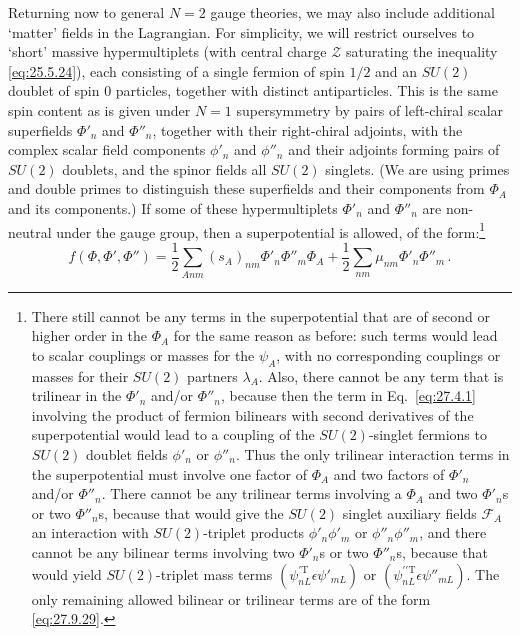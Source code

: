 Returning now to general \(N=2\) gauge theories, we may also include
additional `matter' fields in the Lagrangian. For simplicity, we will restrict
ourselves to `short' massive hypermultiplets (with central charge
\(\mathcal{Z}\) saturating the inequality \eqref{eq:25.5.24}), each consisting
of a single fermion of spin \(1/2\) and an \(SU(2)\) doublet of spin 0
particles, together with distinct antiparticles. This is the same spin
content as is given under \(N=1\) supersymmetry by pairs of left-chiral
scalar superfields \(\Phi'_n\) and \(\Phi''_n\), together with their
right-chiral adjoints, with the complex scalar field components \(\phi'_n\)
and \(\phi''_n\) and their adjoints forming pairs of \(SU(2)\) doublets, and
the spinor fields all \(SU(2)\) singlets. (We are using primes and double
primes to distinguish these superfields and their components from \(\Phi_A\)
and its components.) If some of these hypermultiplets \(\Phi'_n\) and
\(\Phi''_n\) are non-neutral under the gauge group, then a superpotential is
allowed, of the form:\footnote{There still cannot be any terms in the
superpotential that are of second or higher order in the \(\Phi_A\) for the
same reason as before: such terms would lead to scalar couplings or masses
for the \(\psi_A\), with no corresponding couplings or masses for their
\(SU(2)\) partners \(\lambda_A\). Also, there cannot be any term that is
trilinear in the \(\Phi'_n\) and/or \(\Phi''_n\), because then the term in
Eq.~\eqref{eq:27.4.1} involving the product of fermion bilinears with second
derivatives of the superpotential would lead to a coupling of the
\(SU(2)\)-singlet fermions to \(SU(2)\) doublet fields \(\phi'_n\) or
\(\phi''_n\). Thus the only trilinear interaction terms in the
superpotential must involve one factor of \(\Phi_A\) and two factors of
\(\Phi'_n\) and/or \(\Phi''_n\). There cannot be any trilinear terms
involving a \(\Phi_A\) and two \(\Phi'_n\)s or two \(\Phi''_n\)s, because
that would give the \(SU(2)\) singlet auxiliary fields \(\mathcal{F}_A\) an
interaction with \(SU(2)\)-triplet products \(\phi'_n\phi'_m\) or
\(\phi''_n\phi''_m\), and there cannot be any bilinear terms involving two
\(\Phi'_n\)s or two \(\Phi''_n\)s, because that would yield \(SU(2)\)-triplet
mass terms \((\psi_{nL}^{\prime\mathrm T}\epsilon\psi'_{mL})\) or
\((\psi_{nL}^{\prime\prime\mathrm T}\epsilon\psi''_{mL})\). The only
remaining allowed bilinear or trilinear terms are of the form
\eqref{eq:27.9.29}.}
\begin{equation}
  f(\Phi,\Phi',\Phi'')
  =\frac12\sum_{Anm}(s_A)_{nm}\Phi'_n\Phi''_m\Phi_A
  +\frac12\sum_{nm}\mu_{nm}\Phi'_n\Phi''_m\,.
  \tag{27.9.29}\label{eq:27.9.29}
\end{equation}
